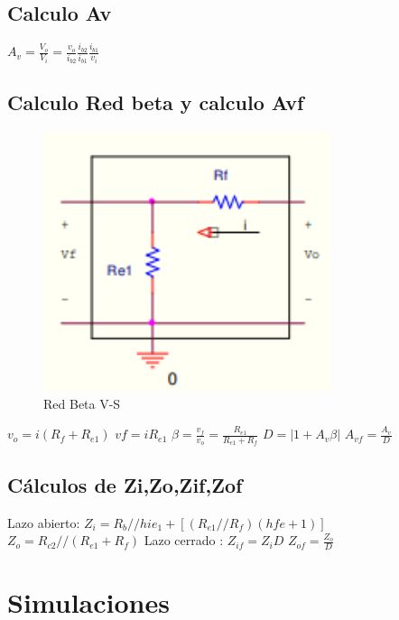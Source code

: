 \documentclass[12pt, letterpaper]{article}
\begin{document}
\subsection{Calculo Av}
$A_v=\frac{V_o}{V_i}=\frac{v_o}{i_{b2}}\frac{i_{b2}}{i_{b1}}\frac{i_{b1}}{v_i}$
\subsection{Calculo Red beta y calculo Avf}
\begin{figure}[h]
	\centering
	\includegraphics[width=0.75\textwidth]{Imagenes/Screenshot_58.png}
	\caption{Red Beta  V-S}
	\label{fig:2.2.1}
\end{figure}
\singlespacing
$v_o=i(R_f+R_{e1})$ \hspace{1cm} $vf=iR_{e1}$
\singlespacing
$\beta = \frac{v_f}{v_o}=\frac{R_{e1}}{R_{e1}+R_f}$
\singlespacing
$D=|1+A_v\beta|$ \hspace{1cm} $A_{vf}=\frac{A_v}{D}$
\subsection{Cálculos de Zi,Zo,Zif,Zof}
Lazo abierto:
$Z_i=R_b//{hie_1+[(R_{e1}//R_f)(hfe+1)]}$
\singlespacing
$Z_o=R_{c2}//(R_{e1}+R_f)$
\singlespacing
Lazo cerrado :
$Z_{if}=Z_iD$
\singlespacing
$Z_{of}=\frac{Z_o}{D}$

\section{Simulaciones}
\end{document}
